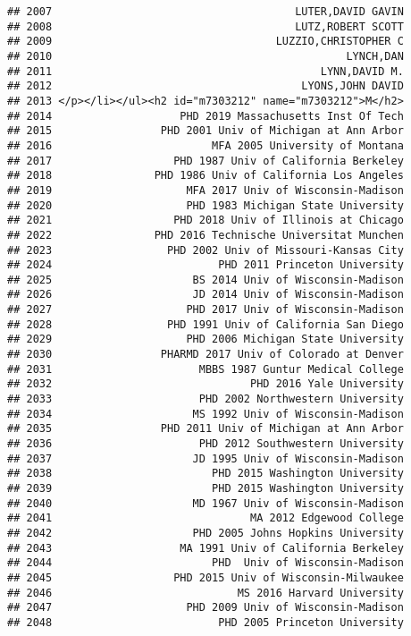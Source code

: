 \documentclass[
]{article}
\begin{document}
\begin{verbatim}
## 2007                                      LUTER,DAVID GAVIN
## 2008                                      LUTZ,ROBERT SCOTT
## 2009                                   LUZZIO,CHRISTOPHER C
## 2010                                              LYNCH,DAN
## 2011                                          LYNN,DAVID M.
## 2012                                       LYONS,JOHN DAVID
## 2013 </p></li></ul><h2 id="m7303212" name="m7303212">M</h2>
## 2014                    PHD 2019 Massachusetts Inst Of Tech
## 2015                 PHD 2001 Univ of Michigan at Ann Arbor
## 2016                         MFA 2005 University of Montana
## 2017                   PHD 1987 Univ of California Berkeley
## 2018                PHD 1986 Univ of California Los Angeles
## 2019                     MFA 2017 Univ of Wisconsin-Madison
## 2020                     PHD 1983 Michigan State University
## 2021                   PHD 2018 Univ of Illinois at Chicago
## 2022                PHD 2016 Technische Universitat Munchen
## 2023                  PHD 2002 Univ of Missouri-Kansas City
## 2024                          PHD 2011 Princeton University
## 2025                      BS 2014 Univ of Wisconsin-Madison
## 2026                      JD 2014 Univ of Wisconsin-Madison
## 2027                     PHD 2017 Univ of Wisconsin-Madison
## 2028                  PHD 1991 Univ of California San Diego
## 2029                     PHD 2006 Michigan State University
## 2030                 PHARMD 2017 Univ of Colorado at Denver
## 2031                       MBBS 1987 Guntur Medical College
## 2032                               PHD 2016 Yale University
## 2033                       PHD 2002 Northwestern University
## 2034                      MS 1992 Univ of Wisconsin-Madison
## 2035                 PHD 2011 Univ of Michigan at Ann Arbor
## 2036                       PHD 2012 Southwestern University
## 2037                      JD 1995 Univ of Wisconsin-Madison
## 2038                         PHD 2015 Washington University
## 2039                         PHD 2015 Washington University
## 2040                      MD 1967 Univ of Wisconsin-Madison
## 2041                               MA 2012 Edgewood College
## 2042                      PHD 2005 Johns Hopkins University
## 2043                    MA 1991 Univ of California Berkeley
## 2044                         PHD  Univ of Wisconsin-Madison
## 2045                   PHD 2015 Univ of Wisconsin-Milwaukee
## 2046                             MS 2016 Harvard University
## 2047                     PHD 2009 Univ of Wisconsin-Madison
## 2048                          PHD 2005 Princeton University

\end{verbatim}
\end{document}
